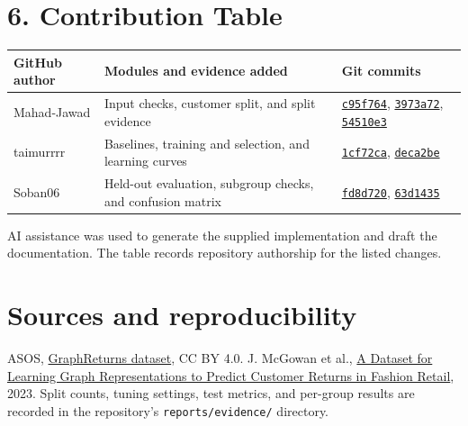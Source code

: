 \documentclass[11pt,a4paper]{article}
\newcommand{\commit}[1]{\href{https://github.com/Soban06/Reclaim/commit/#1}{\texttt{#1}}}
\begin{document}
\section*{6. Contribution Table}
\begin{center}
\small
\begin{tabularx}{\linewidth}{@{}lXl@{}}
\toprule GitHub author & Modules and evidence added & Git commits\\ \midrule
Mahad-Jawad & Input checks, customer split, and split evidence & \commit{c95f764}, \commit{3973a72}, \commit{54510e3}\\
taimurrrr & Baselines, training and selection, and learning curves & \commit{1cf72ca}, \commit{deca2be}\\
Soban06 & Held-out evaluation, subgroup checks, and confusion matrix & \commit{fd8d720}, \commit{63d1435}\\ \bottomrule
\end{tabularx}
\end{center}
AI assistance was used to generate the supplied implementation and draft the documentation. The table records repository authorship for the listed changes.

\section*{Sources and reproducibility}
ASOS, \href{https://osf.io/c793h/}{GraphReturns dataset}, CC BY 4.0. J. McGowan et al., \href{https://arxiv.org/abs/2302.14096}{A Dataset for Learning Graph Representations to Predict Customer Returns in Fashion Retail}, 2023. Split counts, tuning settings, test metrics, and per-group results are recorded in the repository's \texttt{reports/evidence/} directory.
\end{document}

